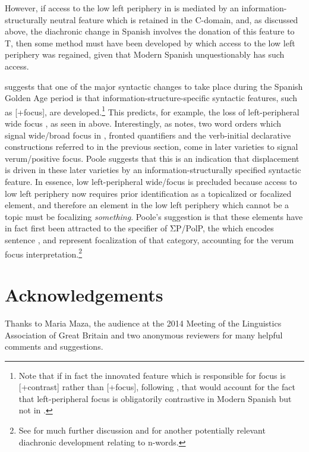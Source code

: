 \documentclass[output=paper]{LSP/langsci}
\begin{document}
However, if access to the low left periphery in  is mediated by an in\-for\-ma\-tion-struc\-tur\-al\-ly neutral  feature which is retained in the C-domain, and, as discussed above, the diachronic change in Spanish involves the donation of this feature to T, then some method must have been developed by which access to the low left periphery was regained, given that Modern Spanish unquestionably has such access.  

\citet{Poole2016} suggests that one of the major syntactic changes to take place during the Spanish Golden Age period is that information-structure-specific syntactic features, such as [+focus], are developed.\footnote{Note that if in fact the innovated feature which is responsible for focus is [+contrast] rather than [+focus], following \citealt{Lopez2009}, that would account for the fact that left-peripheral focus is obligatorily contrastive in Modern Spanish but not in .}  This predicts, for example, the loss of left-peripheral wide focus , as seen in  above.  Interestingly, as \citet{Poole2016} notes, two word orders which signal wide/broad focus in ,  fronted quantifiers and the verb-initial declarative constructions referred to in the previous section, come in later varieties to signal verum/positive  focus.  Poole suggests that this is an indication that displacement is driven in these later varieties by an in\-for\-ma\-tion-struc\-tur\-al\-ly specified syntactic feature.  In essence, low left-peripheral wide/focus is precluded because access to low left periphery now requires prior identification as a topicalized or focalized element, and therefore an element in the low left periphery which cannot be a topic must be focalizing \textit{something}.  Poole’s suggestion is that these elements have in fact first been attracted to the specifier of ΣP/PolP, the  which encodes sentence , and represent focalization of that category, accounting for the verum focus interpretation.\footnote{See \citealt{Poole2016} for much further discussion and \citealt{Poole2011} for another potentially relevant diachronic development relating to n-words.} 

\section*{Acknowledgements}
Thanks to Maria Maza, the audience at the 2014 Meeting of the Linguistics Association of Great Britain and two anonymous reviewers for many helpful comments and suggestions.  
 
\printbibliography[heading=subbibliography,notkeyword=this]
\end{document}
